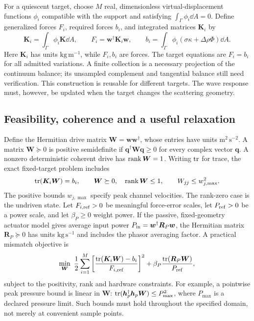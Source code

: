 For a quiescent target, choose $M$ real, dimensionless virtual-displacement
functions $\phi_i$ compatible with the support and satisfying
$\int_\Gamma\phi_i\dd A=0$. Define generalized forces $F_i$, required forces
$b_i$, and integrated matrices $\bm K_i$ by
\begin{equation}
 \bm K_i=\int_\Gamma\phi_i\bm K\dd A,\qquad
 F_i=\bm w^\dagger\bm K_i\bm w,\qquad
 b_i=\int_\Gamma\phi_i(\sigma\kappa+\Delta\rho\Phi)\dd A.
 \label{eq:modal-loads}
\end{equation}
Here $\bm K_i$ has units $\mathrm{kg\,m^{-1}}$, while $F_i,b_i$ are forces.
The target equations are $F_i=b_i$ for all admitted variations. A finite
collection is a necessary projection of the continuum balance; its unsampled
complement and tangential balance still need verification. This construction
is reusable for different targets. The wave response must, however, be updated
when the target changes the scattering geometry.

\subsection{Feasibility, coherence and a useful relaxation}
Define the Hermitian drive matrix $\bm W=\bm w\bm w^\dagger$, whose entries
have units $\mathrm{m^2\,s^{-2}}$. A matrix $\bm W\succeq0$ is positive
semidefinite if $\bm q^\dagger\bm W\bm q\geq0$ for every complex vector
$\bm q$. A nonzero deterministic coherent drive has $\operatorname{rank}\bm W=1$.
Writing $\operatorname{tr}$ for trace, the exact fixed-target problem includes
\begin{equation}
 \operatorname{tr}(\bm K_i\bm W)=b_i,\qquad
 \bm W\succeq0,\quad\operatorname{rank}\bm W\leq1,\qquad
 W_{jj}\leq w_{j,\max}^2.
 \label{eq:lifted-feasibility}
\end{equation}
The positive bounds $w_{j,\max}$ specify peak channel velocities. The rank-zero
case is the undriven state. Let $F_{i,\rm ref}>0$ be meaningful force-error
scales, let $P_{\rm ref}>0$ be a power scale, and let $\beta_P\geq0$ weight
power. If the passive, fixed-geometry actuator model gives average input power
$P_{\rm in}=\bm w^\dagger\bm R_P\bm w$, the Hermitian matrix
$\bm R_P\succeq0$ has units $\mathrm{kg\,s^{-1}}$ and includes the phasor
averaging factor. A practical mismatch objective is
\begin{equation}
 \min_{\bm W}\ \frac12\sum_{i=1}^M
  \left[\frac{\operatorname{tr}(\bm K_i\bm W)-b_i}{F_{i,\rm ref}}\right]^2
       +\beta_P\frac{\operatorname{tr}(\bm R_P\bm W)}{P_{\rm ref}},
 \label{eq:sdr-cost}
\end{equation}
subject to the positivity, rank and hardware constraints. For example, a
pointwise peak pressure bound is linear in $\bm W$:
$\operatorname{tr}(\bm h_p^\dagger\bm h_p\bm W)\leq P_{\max}^2$, where $P_{\max}$ is a
declared pressure limit. Such bounds must hold throughout the specified domain,
not merely at convenient sample points.

